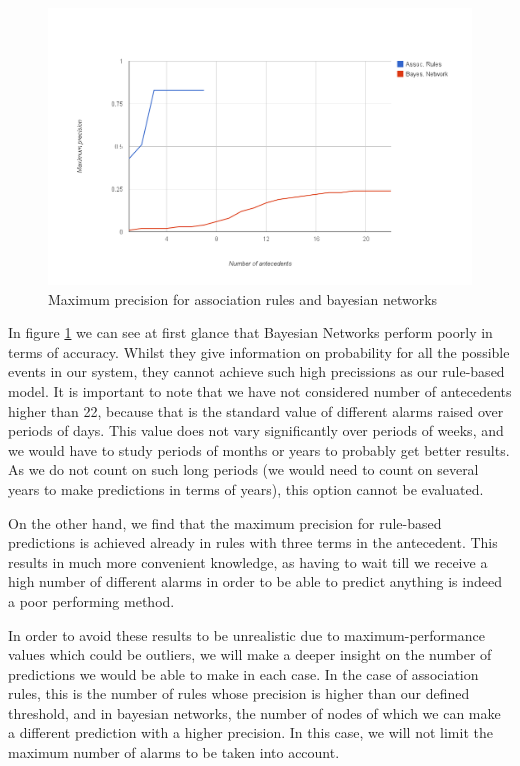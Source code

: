 \documentclass[a4paper,12pt]{article}
\begin{document}
\begin{figure}[hbtp]
\includegraphics[width=\textwidth]{img/assoc_vs_bayes.png}
\caption{Maximum precision for association rules and bayesian networks} \label{fig:accuracy_cspade_bn}
\end{figure}

In figure \ref{fig:accuracy_cspade_bn} we can see at first glance that Bayesian Networks perform poorly in terms of accuracy. Whilst they give information on probability for all the possible events in our system, they cannot achieve such high precissions as our rule-based model. It is important to note that we have not considered number of antecedents higher than 22, because that is the standard value of different alarms raised over periods of days. This value does not vary significantly over periods of weeks, and we would have to study periods of months or years to probably get better results. As we do not count on such long periods (we would need to count on several years to make predictions in terms of years), this option cannot be evaluated.

On the other hand, we find that the maximum precision for rule-based predictions is achieved already in rules with three terms in the antecedent. This results in much more convenient knowledge, as having to wait till we receive a high number of different alarms in order to be able to predict anything is indeed a poor performing method.

In order to avoid these results to be unrealistic due to maximum-performance values which could be outliers, we will make a deeper insight on the number of predictions we would be able to make in each case. In the case of association rules, this is the number of rules whose precision is higher than our defined threshold, and in bayesian networks, the number of nodes of which we can make a different prediction with a higher precision. In this case, we will not limit the maximum number of alarms to be taken into account.
\end{document}
